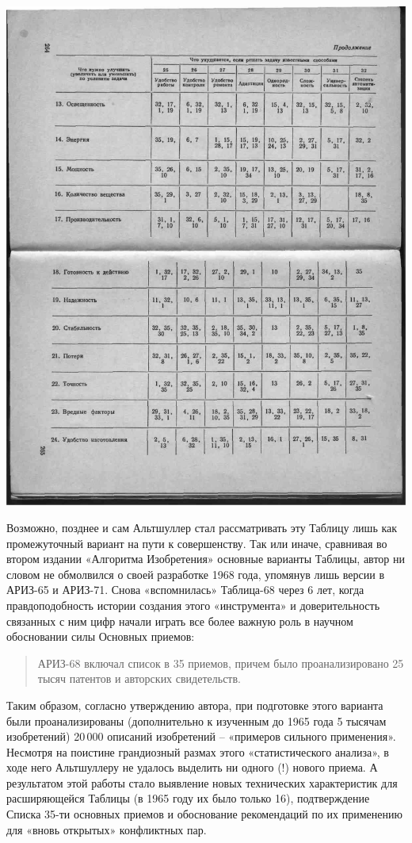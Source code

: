 \documentclass[11pt,a4paper]{article}
\begin{document}
\begin{center}
  \includegraphics[width=.8\textwidth]{./13.jpg}
\end{center}

Возможно, позднее и сам Альтшуллер стал рассматривать эту Таблицу лишь как
промежуточный вариант на пути к совершенству. Так или иначе, сравнивая во
втором издании «Алгоритма Изобретения» основные варианты Таблицы, автор ни
словом не обмолвился о своей разработке 1968 года, упомянув лишь версии в
АРИЗ-65 и АРИЗ-71. Снова «вспомнилась» Таблица-68 через 6 лет, когда
правдоподобность истории создания этого «инструмента» и доверительность
связанных с ним цифр начали играть все более важную роль в научном обосновании
силы Основных приемов:
\begin{quote}
  АРИЗ-68 включал список в 35 приемов, причем было проанализировано 25 тысяч
  патентов и авторских свидетельств.  \cite[с. 98]{Altshuller1979}
\end{quote}
Таким образом, согласно утверждению автора, при подготовке этого варианта были
проанализированы (дополнительно к изученным до 1965 года 5 тысячам
изобретений) 20\,000 описаний изобретений -- «примеров сильного применения».
Несмотря на поистине грандиозный размах этого «статистического анализа», в
ходе него Альтшуллеру не удалось выделить ни одного (!) нового приема. А
результатом этой работы стало выявление новых технических характеристик для
расширяющейся Таблицы (в 1965 году их было только 16), подтверждение Списка
35-ти основных приемов и обоснование рекомендаций по их применению для «вновь
открытых» конфликтных пар.
\end{document}
